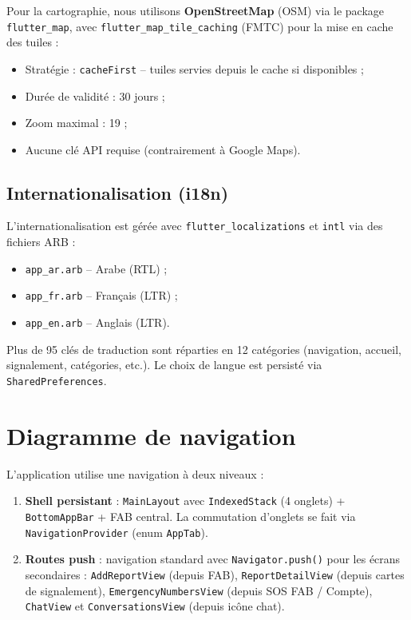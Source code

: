 \documentclass[12pt,a4paper]{report}
\begin{document}
Pour la cartographie, nous utilisons \textbf{OpenStreetMap} (OSM) via le package \texttt{flutter\_map}, avec \texttt{flutter\_map\_tile\_caching} (FMTC) pour la mise en cache des tuiles :

\begin{itemize}
    \item Stratégie : \texttt{cacheFirst} -- tuiles servies depuis le cache si disponibles ;
    \item Durée de validité : 30 jours ;
    \item Zoom maximal : 19 ;
    \item Aucune clé API requise (contrairement à Google Maps).
\end{itemize}

\subsection{Internationalisation (i18n)}

L'internationalisation est gérée avec \texttt{flutter\_localizations} et \texttt{intl} via des fichiers ARB :

\begin{itemize}
    \item \texttt{app\_ar.arb} -- Arabe (RTL) ;
    \item \texttt{app\_fr.arb} -- Français (LTR) ;
    \item \texttt{app\_en.arb} -- Anglais (LTR).
\end{itemize}

Plus de 95 clés de traduction sont réparties en 12 catégories (navigation, accueil, signalement, catégories, etc.). Le choix de langue est persisté via \texttt{SharedPreferences}.

\section{Diagramme de navigation}

L'application utilise une navigation à deux niveaux :

\begin{enumerate}
    \item \textbf{Shell persistant} : \texttt{MainLayout} avec \texttt{IndexedStack} (4 onglets) + \texttt{BottomAppBar} + FAB central. La commutation d'onglets se fait via \texttt{NavigationProvider} (enum \texttt{AppTab}).
    \item \textbf{Routes push} : navigation standard avec \texttt{Navigator.push()} pour les écrans secondaires : \texttt{AddReportView} (depuis FAB), \texttt{ReportDetailView} (depuis cartes de signalement), \texttt{EmergencyNumbersView} (depuis SOS FAB / Compte), \texttt{ChatView} et \texttt{ConversationsView} (depuis icône chat).
\end{enumerate}
\end{document}

